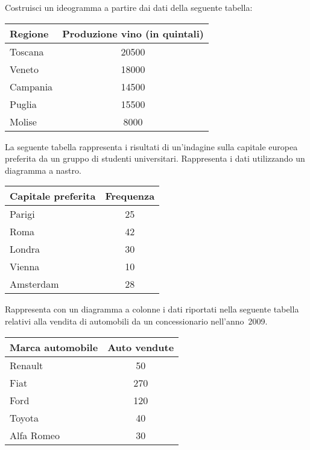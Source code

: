 \begin{esercizio}
\label{ese:A.14}
Costruisci un ideogramma a partire dai dati della seguente tabella:
\begin{center}
\begin{tabular}{lc}
\toprule
Regione & Produzione vino (in quintali)\\
\midrule
Toscana & 20500\\
Veneto & 18000\\
Campania & 14500\\
Puglia & 15500\\
Molise & 8000\\
\bottomrule
\end{tabular}
\end{center}

\end{esercizio}

\begin{esercizio}
\label{ese:A.15}
La seguente tabella rappresenta i risultati di un'indagine sulla capitale europea preferita da un gruppo di studenti universitari.
Rappresenta i dati utilizzando un diagramma a nastro.
\begin{center}
\begin{tabular}{lc}
\toprule
Capitale preferita & Frequenza\\
\midrule
Parigi & 25\\
Roma & 42\\
Londra & 30\\
Vienna & 10\\
Amsterdam & 28\\
\bottomrule
\end{tabular}
\end{center}
\end{esercizio}

\begin{esercizio}
\label{ese:A.16}
Rappresenta con un diagramma a colonne i dati riportati nella seguente tabella relativi alla vendita di automobili da un concessionario nell'anno~2009.
\begin{center}
\begin{tabular}{lc}
\toprule
Marca automobile & Auto vendute\\
\midrule
Renault & 50\\
Fiat & 270\\
Ford & 120\\
Toyota & 40\\
Alfa Romeo & 30\\
\bottomrule
\end{tabular}
\end{center}
\end{esercizio}

